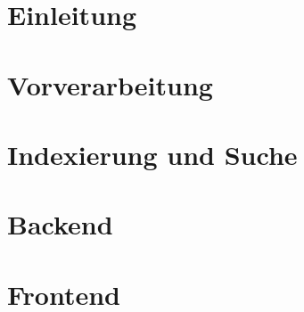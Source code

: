 




\pagestyle{empty} %



\pagestyle{useheadings} %
\setcounter{tocdepth}{3}    %
\setcounter{secnumdepth}{3} %

\tableofcontents %









\chapter{Einleitung}\label{ch:intro}


\chapter{Vorverarbeitung}\label{ch:prepros}


\chapter{Indexierung und Suche}\label{ch:indexing}


\chapter{Backend}\label{ch:backend}


\chapter{Frontend}\label{ch:frontend} 
 

